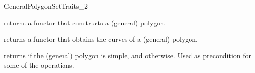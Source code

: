 \begin{ccRefConcept}{GeneralPolygonSetTraits_2}

{returns a functor that constructs a (general) polygon.}

{returns a functor that obtains the curves of a (general) polygon.}

\ccPredicates
{returns  if the (general) polygon  is simple, and
 otherwise. Used as precondition for some of the operations.}

\ccHasModels

\ccSeeAlso
\ccSeeAlso
  \\

\end{ccRefConcept}

\ccRefPageEnd
